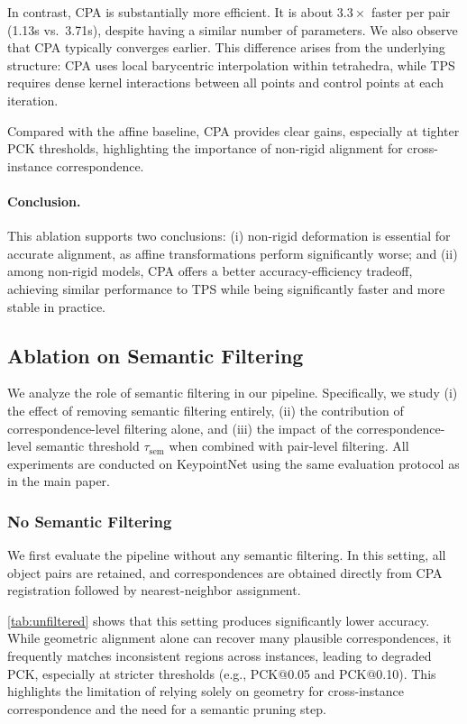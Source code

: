 In contrast, CPA is substantially more efficient. It is about $3.3\times$ faster per pair (1.13s vs.\ 3.71s), despite having a similar number of parameters. We also observe that CPA typically converges earlier. This difference arises from the underlying structure: CPA uses local barycentric interpolation within tetrahedra, while TPS requires dense kernel interactions between all points and control points at each iteration.

Compared with the affine baseline, CPA provides clear gains, especially at tighter PCK thresholds, highlighting the importance of non-rigid alignment for cross-instance correspondence.

\paragraph{Conclusion.}
This ablation supports two conclusions: (i) non-rigid deformation is essential for accurate alignment, as affine transformations perform significantly worse; and (ii) among non-rigid models, CPA offers a better accuracy-efficiency tradeoff, achieving similar performance to TPS while being significantly faster and more stable in practice.

\subsection{Ablation on Semantic Filtering}
\label{sup:ablation_semantic_filtering}

We analyze the role of semantic filtering in our pipeline. Specifically, we study (i) the effect of removing semantic filtering entirely, (ii) the contribution of correspondence-level filtering alone, and (iii) the impact of the correspondence-level semantic threshold $\tau_{\mathrm{sem}}$ when combined with pair-level filtering. All experiments are conducted on KeypointNet using the same evaluation protocol as in the main paper.

\subsubsection{No Semantic Filtering}
\label{sup:no_semantic_filtering}

We first evaluate the pipeline without any semantic filtering. In this setting, all object pairs are retained, and correspondences are obtained directly from CPA registration followed by nearest-neighbor assignment.

\autoref{tab:unfiltered} shows that this setting produces significantly lower accuracy. While geometric alignment alone can recover many plausible correspondences, it frequently matches inconsistent regions across instances, leading to degraded PCK, especially at stricter thresholds (e.g., PCK@0.05 and PCK@0.10). This highlights the limitation of relying solely on geometry for cross-instance correspondence and the need for a semantic pruning step.

